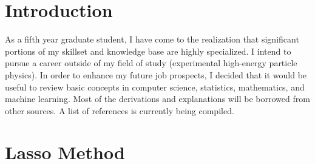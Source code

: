 \documentclass[
10pt, %
a4paper, %
oneside, %
headinclude,footinclude, %
BCOR5mm, %
]{scrartcl}
\begin{document}
{\let\thefootnote\relax{}}


\newpage %


\section{Introduction}

As a fifth year graduate student, I have come to the realization that significant portions of my skillset and knowledge base are highly specialized. I intend to pursue a career outside of my field of study (experimental high-energy particle physics). In order to enhance my future job prospects, I decided that it would be useful to review basic concepts in computer science, statistics, mathematics, and machine learning. Most of the derivations and explanations will be borrowed from other sources. A list of references is currently being compiled. 







\section{Lasso Method}

\end{document}
